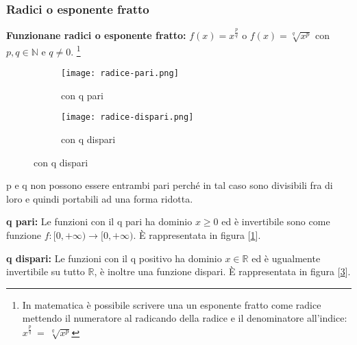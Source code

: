 \subsubsection{Radici o esponente fratto}
\textbf{Funzionane radici o esponente fratto:} $f(x) = x^{\frac{p}{q}}$ o $f(x) = \sqrt[q]{x^p}$  \: \: con  \: \:  $p, q \in \mathbb{N}$ \: \: e  \: \:  $q \neq 0$. \footnote{In matematica è possibile scrivere una un esponente fratto come radice mettendo il numeratore al radicando della radice e il denominatore all'indice: $x^{\frac{p}{q}} \: = \: \sqrt[q]{x^p}$}
\begin{figure}[h!]
    \begin{subfigure}{.5\textwidth}
        \centering
        \texttt{[image: radice-pari.png]}
        \caption{con q pari}
        \label{fig:radice-pari}
    \end{subfigure}
    \begin{subfigure}{.5\textwidth}
        \centering
        \texttt{[image: radice-dispari.png]}
        \caption{con q dispari}
        \label{fig:radice-dispari}
    \end{subfigure}
\end{figure}
\begin{note}
    p e q non possono essere entrambi pari perché in tal caso sono divisibili fra di loro e quindi portabili ad una forma ridotta.
\end{note}
\begin{observation}
    \textbf{q pari:} Le funzioni con il q pari ha dominio $ x \geq 0$ ed è invertibile sono come funzione $f: [0, +\infty) \longrightarrow [0, +\infty)$. È rappresentata in figura [\ref{fig:radice-pari}].
\end{observation}
\begin{observation}
    \textbf{q dispari:} Le funzioni con il q positivo ha dominio $x \in \mathbb{R}$ ed è ugualmente invertibile su tutto $\mathbb{R}$, è inoltre una funzione dispari. È rappresentata in figura [\ref{fig:radice-dispari}].\\
\end{observation}

